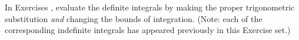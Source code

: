 {\noindent In Exercises}
{,  evaluate the definite integrals by making the proper trigonometric substitution \emph{and} changing the bounds of integration. (Note: each of the corresponding indefinite integrals has appeared previously in this Exercise set.)}
